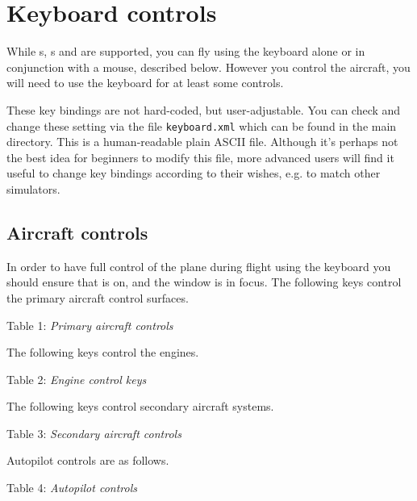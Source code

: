 \section{Keyboard controls}

While s, s and  are supported,
you can fly \FlightGear{} using the keyboard alone or in conjunction with a mouse,
described below. However you control the aircraft, you will need to use the keyboard
for at least some controls.

These key bindings are not hard-coded, but
user-adjustable. You can check and change these setting via the file
\texttt{keyboard.xml} which can be found in the main
\FlightGear{} directory. This is a human-readable plain ASCII file.
Although it's perhaps not the best idea for beginners to modify this file,
more advanced users will find it useful to change key bindings according to
their wishes, e.g. to match other simulators.

\subsection{Aircraft controls}

In order to have full control of the plane during flight using the keyboard you should ensure that
\texttt{} is on, and the \FlightGear{} window is in focus. The following keys control
the primary aircraft control surfaces.

\medskip
\centerline{}
Table 1: \textit{Primary aircraft controls}
\medskip

The following keys control the engines.

\medskip
\centerline{}
Table 2: \textit{Engine control keys}
\medskip

The following keys control secondary aircraft systems.

\medskip
\centerline{}
Table 3: \textit{Secondary aircraft controls}
\medskip

Autopilot controls are as follows.

\medskip
\centerline{}
Table 4: \textit{Autopilot controls}
\medskip

